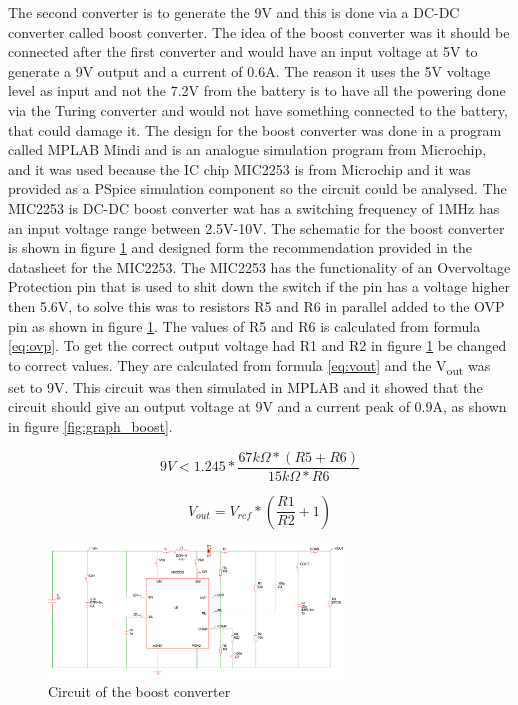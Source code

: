 \documentclass[11pt, titlepage]{article} %
\begin{document}
The second converter is to generate the 9V and this is done via a DC-DC converter called boost converter. The idea of the boost converter was it should be connected after the first converter and would have an input voltage at 5V to generate a 9V output and a current of 0.6A. The reason it uses the 5V voltage level as input and not the 7.2V from the battery is to have all the powering done via the Turing converter and would not have something connected to the battery, that could damage it. The design for the boost converter was done in a program called MPLAB Mindi and is an analogue simulation program from Microchip, and it was used because the IC chip MIC2253 is from Microchip and it was provided as a PSpice simulation component so the circuit could be analysed. The MIC2253 is DC-DC boost converter wat has a switching frequency of 1MHz has an input voltage range between 2.5V-10V. The schematic for the boost converter is shown in figure \ref{fig:circuit_boost_converter} and designed form the recommendation provided in the datasheet for the MIC2253. The MIC2253 has the functionality of an Overvoltage Protection pin that is used to shit down the switch if the pin has a voltage higher then 5.6V, to solve this was to resistors R5 and R6 in parallel added to the OVP pin as shown in figure \ref{fig:circuit_boost_converter}. The values of R5 and R6 is calculated from formula \ref{eq:ovp}. To get the correct output voltage had R1 and R2 in figure \ref{fig:circuit_boost_converter} be changed to correct values. They are calculated from formula \ref{eq:vout} and the V\textsubscript{out} was set to 9V. This circuit was then simulated in MPLAB and it showed that the circuit should give an output voltage at 9V and a current peak of 0.9A, as shown in figure \ref{fig:graph_boost}. 

\begin{equation}
	9V < 1.245 * \frac{67k \Omega * (R5 + R6) }{15k \Omega * R6}	
	\label{eq:ovp} 	
\end{equation}

\begin{equation}
	V_{out} = V_{ref} * (\frac{R1}{R2} + 1)
	\label{eq:vout}
\end{equation}



\begin{figure}
	\centering
	\includegraphics[width=0.7\textwidth]{boost_converter_curcuit.pdf}
	\caption{Circuit of the boost converter}
	\label{fig:circuit_boost_converter}
\end{figure}
\end{document}
